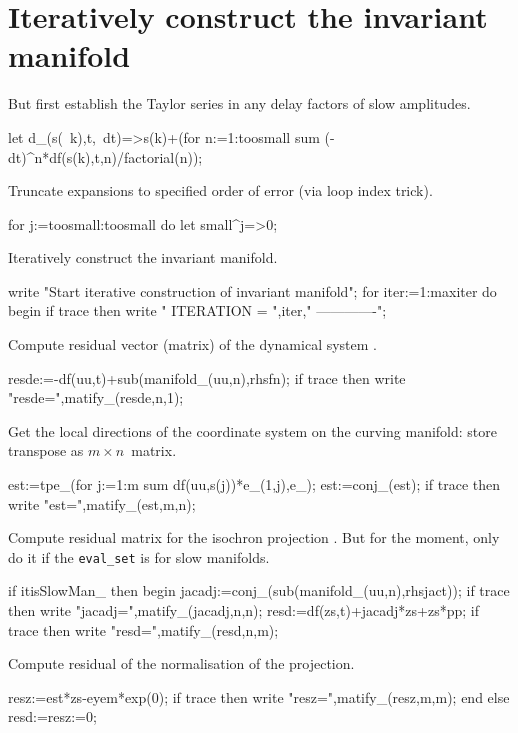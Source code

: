 \documentclass[11pt,a5paper]{article}
\begin{document}
\section{Iteratively construct the invariant manifold}

But first establish the Taylor series in any delay factors
of slow amplitudes.
\begin{reduce}
let d_(s(~k),t,~dt)=>s(k)+(for n:=1:toosmall sum 
        (-dt)^n*df(s(k),t,n)/factorial(n));
\end{reduce}

Truncate expansions to specified order of error (via loop
index trick).
\begin{reduce}
for j:=toosmall:toosmall do let small^j=>0;
\end{reduce}

Iteratively construct the invariant manifold.
\begin{reduce}
write "Start iterative construction of invariant manifold";
for iter:=1:maxiter do begin
if trace then write "
ITERATION = ",iter,"
-------------";
\end{reduce}

Compute residual vector (matrix) of the dynamical system
\cite{Roberts96a}.
\begin{reduce}
resde:=-df(uu,t)+sub(manifold_(uu,n),rhsfn);
if trace then write "resde=",matify_(resde,n,1);
\end{reduce}

Get the local directions of the coordinate system on the
curving manifold: store transpose as \(m\times n\)~matrix.
\begin{reduce}
est:=tpe_(for j:=1:m sum df(uu,s(j))*e_(1,j),e_);
est:=conj_(est);
if trace then write "est=",matify_(est,m,n);
\end{reduce}

Compute residual matrix for the isochron projection
\cite{Roberts89b, Roberts97b}. But for the moment, only do
it if the \verb|eval_set| is for slow manifolds.
\begin{reduce}
if itisSlowMan_ then begin
    jacadj:=conj_(sub(manifold_(uu,n),rhsjact));
    if trace then write "jacadj=",matify_(jacadj,n,n);
    resd:=df(zs,t)+jacadj*zs+zs*pp;
    if trace then write "resd=",matify_(resd,n,m);
\end{reduce}

Compute residual of the normalisation of the projection.
\begin{reduce}
    resz:=est*zs-eyem*exp(0);
    if trace then write "resz=",matify_(resz,m,m);
end else resd:=resz:=0; %
\end{reduce}
\end{document}
